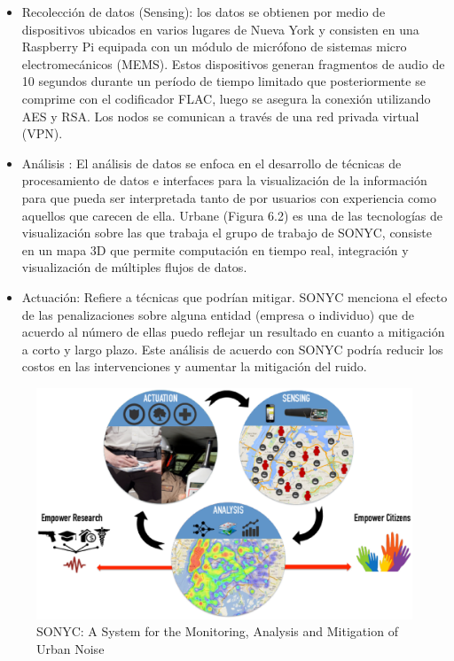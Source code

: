 \begin{itemize}
\item Recolección de datos (Sensing): los datos se obtienen por medio de dispositivos ubicados en varios lugares de Nueva York y consisten en una Raspberry Pi equipada con un módulo de micrófono de sistemas micro electromecánicos (MEMS). Estos dispositivos generan fragmentos de audio de 10 segundos durante un período de tiempo limitado que posteriormente se comprime con el codificador FLAC, luego se asegura la conexión utilizando AES y RSA. Los nodos se comunican a través de una red privada virtual (VPN)\cite{Bello2018}. 
\item Análisis : El análisis de datos se enfoca en el desarrollo de técnicas de procesamiento de datos e interfaces para la visualización de la información para que pueda ser interpretada tanto de por usuarios con experiencia como aquellos que carecen de ella. Urbane (Figura 6.2) es una de las tecnologías de visualización sobre las que trabaja el grupo de trabajo de SONYC, consiste en un mapa 3D que permite computación en tiempo real, integración y visualización de múltiples flujos de datos\cite{Bello2018}.
\item Actuación: Refiere a técnicas que podrían mitigar. SONYC menciona el efecto de las penalizaciones sobre alguna entidad (empresa o individuo) que de acuerdo al número de ellas puedo reflejar un resultado en cuanto a mitigación a corto y largo plazo. Este análisis de acuerdo con SONYC podría reducir los costos en las intervenciones y aumentar la mitigación del ruido\cite{Bello2018}.
\end{itemize}


\begin{figure}[H]
\centering
\includegraphics[width=\linewidth]{bibliografia/Imagenes/SONYC.eps}
\caption{SONYC: A System for the Monitoring, Analysis and Mitigation of Urban Noise \cite{Bello2018}}
\end{figure}


